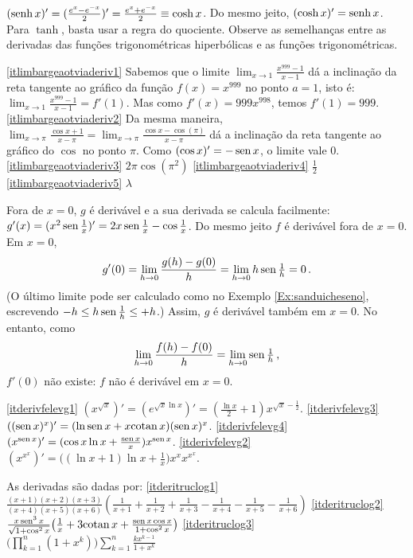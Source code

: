 \begin{Solution}{6.20}
$(\operatorname{senh}
x)'=(\frac{e^x-e^{-x}}{2})'=\frac{e^x+e^{-x}}{2}\equiv \cosh x$.
Do mesmo jeito, $(\cosh x)'=\operatorname{senh} x$.
Para $\tanh$, basta usar a regra do quociente.
Observe as semelhanças entre as derivadas das funções trigonométricas
hiperbólicas e as funções trigonométricas.
\end{Solution}
\begin{Solution}{6.21}
\eqref{itlimbargeaotviaderiv1}
Sabemos que o limite $\lim_{x\to 1}\frac{x^{999}-1}{x-1}$ dá a inclinação da
reta tangente ao gráfico da função $f(x)=x^{999}$ no ponto $a=1$, isto é:
$\lim_{x\to 1}\frac{x^{999}-1}{x-1}=f'(1)$. Mas como
$f'(x)=999x^{998}$, temos $f'(1)=999$.
\eqref{itlimbargeaotviaderiv2}
Da mesma maneira, $\lim_{x\to \pi}\frac{\cos x+1}{x-\pi}=
\lim_{x\to \pi}\frac{\cos x-\cos(\pi)}{x-\pi}$ dá a inclinação da reta tangente
ao gráfico do $\cos$ no ponto $\pi$. Como $(\cos x)'=-\operatorname{sen} x$, o limite vale
$0$.
\eqref{itlimbargeaotviaderiv3} $2\pi \cos(\pi^2)$
\eqref{itlimbargeaotviaderiv4} $\frac12$
\eqref{itlimbargeaotviaderiv5} $\lambda$
\end{Solution}
\begin{Solution}{6.22}
Fora de $x=0$, $g$ é derivável e a sua derivada se calcula facilmente:
$g'(x)=(x^2\operatorname{sen} \frac1x)'=2x\operatorname{sen} \frac1x-\cos\frac1x$.
Do mesmo jeito $f$ é derivável fora de $x=0$.
Em $x=0$,
$$
g'(0)=\lim_{h\to 0}\frac{g(h)-g(0)}{h}=\lim_{h\to 0} h\operatorname{sen} \tfrac1h=0\,.
$$
(O último limite pode ser calculado como no Exemplo \ref{Ex:sanduicheseno},
escrevendo
$-h\leq h\operatorname{sen} \tfrac1h\leq +h$.)
Assim, $g$ é derivável também em $x=0$. No entanto, como
$$\lim_{h\to 0}\frac{f(h)-f(0)}{h}=\lim_{h\to 0} \operatorname{sen} \tfrac1h\,,$$
$f'(0)$ não existe: $f$ não é derivável em $x=0$.
\end{Solution}
\begin{Solution}{6.23}
\eqref{itderivfelevg1}
$(x^{\sqrt{x}})'=(e^{\sqrt{x}\ln x})'=(\frac{\ln x}{2}+1){
x^{\sqrt{x}-\frac12}}$.
\eqref{itderivfelevg3} $((\operatorname{sen} x)^x)'=(\ln \operatorname{sen} x+x{\rm cotan\,} x)(\operatorname{sen} x)^x$.
\eqref{itderivfelevg4} $(x^{\operatorname{sen} x})'=(\cos x\ln x+\frac{\operatorname{sen} x}{x})x^{\operatorname{sen} x}$.
\eqref{itderivfelevg2} $(x^{x^x})'=\bigl((\ln x+1)\ln
x+\frac1x\bigr)x^xx^{x^x}$.
\end{Solution}
\begin{Solution}{6.24}
 As derivadas são dadas por:
\eqref{itderitruclog1}
$\frac{(x+1)(x+2)(x+3)}{(x+4)(x+5)(x+6)}
(\frac{1}{x+1}+\frac{1}{x+2}+\frac{1}{x+3}-\frac{1}{x+4}-\frac{1}{x+5}-\frac{1}{
x+6})$
\eqref{itderitruclog2}
$\frac{x\operatorname{sen}^3x}{\sqrt{1+\cos^2x}}\bigl(\frac{1}{x}+3{\rm cotan\,} x+\frac{\operatorname{sen}
x\cos x}{{1+\cos^2x}}\bigr)$
\eqref{itderitruclog3}
$\bigl(\prod_{k=1}^n(1+x^k)\bigr)\sum_{k=1}^n\frac{kx^{k-1}}{1+x^k}$
\end{Solution}
